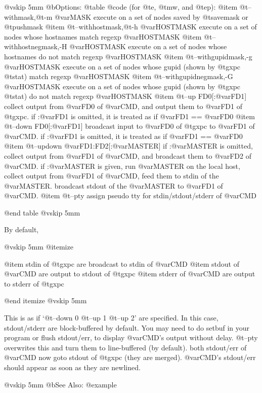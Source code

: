 @vskip 5mm
@b{Options: }
@table @code
(for @t{e}, @t{mw}, and @t{ep}):
@item   @t{--withmask},@t{-m} @var{MASK}
    execute on a set of nodes saved by @t{savemask} or @t{pushmask}
@item   @t{--withhostmask},@t{-h} @var{HOSTMASK}
    execute on a set of nodes whose hostnames match regexp @var{HOSTMASK}
@item   @t{--withhostnegmask},-H @var{HOSTMASK}
    execute on a set of nodes whose hostnames do not match regexp @var{HOSTMASK}
@item   @t{--withgupidmask},-g @var{HOSTMASK}
    execute on a set of nodes whose gupid (shown by @t{gxpc} @t{stat}) 
    match regexp @var{HOSTMASK}
@item   @t{--withgupidnegmask},-G @var{HOSTMASK}
    execute on a set of nodes whose gupid (shown by @t{gxpc} @t{stat}) 
    do not match regexp @var{HOSTMASK}
@item   @t{--up} FD0[:@var{FD1}]
    collect output from @var{FD0} of @var{CMD}, and output them to @var{FD1} of @t{gxpc}.
    if :@var{FD1} is omitted, it is treated as if @var{FD1} == @var{FD0}
@item   @t{--down} FD0[:@var{FD1}]
    broadcast input to @var{FD0} of @t{gxpc} to @var{FD1} of @var{CMD}.
    if :@var{FD1} is omitted, it is treated as if @var{FD1} == @var{FD0}
@item   @t{--updown} @var{FD1}:FD2[:@var{MASTER}]
    if :@var{MASTER} is omitted, collect output from @var{FD1} of @var{CMD},
    and broadcast them to @var{FD2} of @var{CMD}.
    if :@var{MASTER} is given, run @var{MASTER} on the local host, collect
    output from @var{FD1} of @var{CMD}, feed them to stdin of the @var{MASTER}.
    broadcast stdout of the @var{MASTER} to @var{FD1} of @var{CMD}.
@item   @t{--pty}
    assign pseudo tty for stdin/stdout/stderr of @var{CMD}

@end table
@vskip 5mm

By default,

@vskip 5mm
@itemize

@item  stdin of @t{gxpc} are broadcast to stdin of @var{CMD}
@item  stdout of @var{CMD} are output to stdout of @t{gxpc}
@item  stderr of @var{CMD} are output to stderr of @t{gxpc}

@end itemize
@vskip 5mm

This is as if `@t{--down} 0 @t{--up} 1 @t{--up} 2' are specified.  In this
case, stdout/stderr are block-buffered by default.  You may need
to do setbuf in your program or flush stdout/err, to display
@var{CMD}'s output without delay.  @t{--pty} overwrites this and turn them
to line-buffered (by default).  both stdout/err of @var{CMD} now goto
stdout of @t{gxpc} (they are merged).  @var{CMD}'s stdout/err should appear
as soon as they are newlined.

@vskip 5mm
@b{See Also:}
@example

